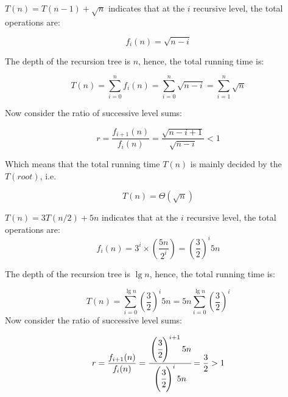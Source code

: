 \begin{homeworkProblem}
\begin{homeworkSubProblem}[\texorpdfstring{$T(n)=T(n-1)+\sqrt{n}$}{T(n)=T(n-1)+sqrt(n)}]

$T(n) = T(n-1) + \sqrt{n}$ indicates that at the $i$ recursive level, the total operations are:

\begin{equation}
f_i(n) = \sqrt{n-i}
\end{equation}

The depth of the recursion tree is $n$, hence, the total running time is:

\[T(n) =\sum_{i=0}^n f_i(n) = \sum_{i=0}^n \sqrt{n-i} = \sum_{i=1}^n \sqrt n\]

Now consider the ratio of successive level sums:

\begin{equation}
r = \frac{f_{i+1}(n)}{f_i(n)}
  = \frac{\sqrt{n-i+1}}{\sqrt{n-i}}
  < 1
\end{equation}

Which means that the total running time $T(n)$ is mainly decided by the $T(root)$, i.e.

\begin{equation} \label{eq:6.4}
T(n) = \Theta(\sqrt n)
\end{equation}

\end{homeworkSubProblem}

\begin{homeworkSubProblem}[\texorpdfstring{$T(n)=3T(n/2)+5n$}{T(n)=3T(n/2)+5n}]
$T(n)=3T(n/2)+5n$ indicates that at the $i$ recursive level, the total
operations are:
\begin{equation}
f_i(n) = 3^i\times\left(\frac{5n}{2^i}\right)
       = \left(\frac{3}{2}\right)^i 5n
\end{equation}

The depth of the recursion tree is $\lg n$, hence, the total running time is:

\begin{equation}
T(n) =\sum_{i=0}^{\lg n}\left(\frac{3}{2}\right)^i 5n
     =5n\sum_{i=0}^{\lg n}\left(\frac{3}{2}\right)^i
\end{equation}
Now consider the ratio of successive level sums:

\begin{equation}
r = \frac{f_{i+1}(n)}{f_i(n)}
  = \cfrac{\left(\cfrac{3}{2}\right)^{i+1} 5n}{\left(\cfrac{3}{2}\right)^i 5n}
  = \frac{3}{2}
  > 1
\end{equation}


\end{homeworkSubProblem}
\end{homeworkProblem}
